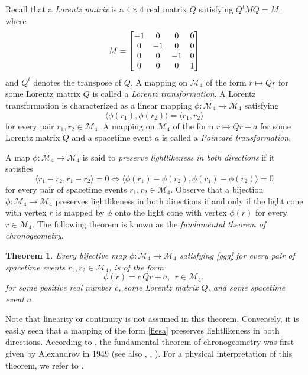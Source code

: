 \documentclass[10pt,a4paper]{amsart}
\providecommand{\index}[1]{}
\newcommand\cM{{\mathcal{M}}}
\newtheorem{theorem}{Theorem}[section]
\theoremstyle{definition}
\theoremstyle{remark}
\numberwithin{subsection}{section}
\numberwithin{equation}{section}
\begin{document}
Recall that a \emph{Lorentz matrix}\index{Lorentz matrix} is a $4\times 4$ real matrix $Q$ satisfying $Q^t MQ = M$, where
\begin{equation}\label{Matrix}
M = \left[ \begin{matrix} -1 & 0 & 0 & 0 \cr
0 & -1 & 0 & 0 \cr
0 & 0 & -1 & 0 \cr
0 & 0 & 0 & 1 \cr\end{matrix} \right] \index{$M$}
\end{equation}
and $Q^t$ denotes the transpose of $Q$.
A mapping on $\cM_4$ of the form $r\mapsto Qr$ for some Lorentz matrix $Q$ is called a \emph{Lorentz transformation}\index{Lorentz transformation}.  
A Lorentz transformation is characterized as a linear mapping $\phi\colon \cM_4\to \cM_4$ satisfying 
\[
\langle \phi(r_1), \phi(r_2) \rangle = \langle r_1 , r_2 \rangle
\] 
for every pair $r_1,r_2\in \cM_4$.
A mapping on $\cM_4$ of the form $r\mapsto Qr+a$ for some Lorentz matrix $Q$ and a spacetime event $a$ is called a \emph{Poincar\'e transformation}\index{Poincar\'e transformation}.

A map $\phi \colon \mathcal{M}_4 \to \mathcal{M}_4$ is said to \emph{preserve lightlikeness in both directions} \index{preserve lightlikeness in both directions} if it satisfies
\begin{equation}\label{ggg}
\langle r_1 - r_2 , r_1 - r_2 \rangle = 0 \iff \langle \phi (r_1 ) - \phi ( r_2 ) , \phi ( r_1 ) - \phi ( r_2 ) \rangle = 0
\end{equation}
for every pair of spacetime events $r_1, r_2 \in \mathcal{M}_4$.
Observe that a bijection $\phi \colon \mathcal{M}_4 \to \mathcal{M}_4$ preserves lightlikeness in both directions if and only if the light cone with vertex $r$ is mapped by $\phi$ onto the light cone with vertex $\phi(r)$ for every $r\in \cM_4$.
The following theorem is known as the \emph{fundamental theorem of chronogeometry}.
\begin{theorem}\index{fundamental theorem of chronogeometry}\label{ftc}
Every bijective map $\phi \colon \mathcal{M}_4 \to \mathcal{M}_4$ satisfying \eqref{ggg} for every pair of spacetime events $r_1, r_2 \in \mathcal{M}_4$, is of the form
\begin{equation}\label{fiesa}
\phi (r) =   c\,Qr + a,\ \ r\in \cM_4,
\end{equation}
for some positive real number $c$, some Lorentz matrix $Q$, and some spacetime event $a$.
\end{theorem}
Note that linearity or continuity is not assumed in this theorem.
Conversely, it is easily seen that a mapping of the form \eqref{fiesa} preserves lightlikeness in both directions.
According to \cite{Al3}, the fundamental theorem of chronogeometry was first given by Alexandrov in 1949 \cite{Al1} (see also \cite{Al2}, \cite{Ben}, \cite{Zee}).
For a physical interpretation of this theorem, we refer to \cite[p.691]{Pfe}. 
\end{document}
